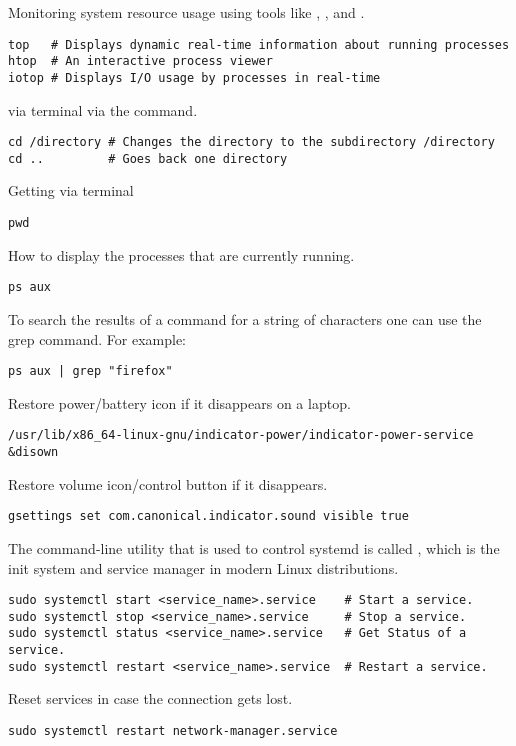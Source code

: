 Monitoring system resource usage using tools like , , and .
\begin{lstlisting}
top   # Displays dynamic real-time information about running processes
htop  # An interactive process viewer
iotop # Displays I/O usage by processes in real-time
\end{lstlisting}

 via terminal via the command.
\begin{lstlisting}
cd /directory # Changes the directory to the subdirectory /directory
cd ..         # Goes back one directory
\end{lstlisting}

Getting  via terminal
\begin{lstlisting}
pwd
\end{lstlisting}

How to display the processes that are currently running.
\begin{lstlisting}
ps aux
\end{lstlisting}

To search the results of a command for a string of characters one can use the grep command. For example:
\begin{lstlisting}
ps aux | grep "firefox"
\end{lstlisting}

Restore power/battery icon if it disappears on a laptop.
\begin{lstlisting}
/usr/lib/x86_64-linux-gnu/indicator-power/indicator-power-service &disown 
\end{lstlisting}

Restore volume icon/control button if it disappears.
\begin{lstlisting}
gsettings set com.canonical.indicator.sound visible true
\end{lstlisting}

The command-line utility that is used to control systemd is called , which is the init system and service manager in modern Linux distributions.
\begin{lstlisting}
sudo systemctl start <service_name>.service    # Start a service.
sudo systemctl stop <service_name>.service     # Stop a service.
sudo systemctl status <service_name>.service   # Get Status of a service.
sudo systemctl restart <service_name>.service  # Restart a service.
\end{lstlisting}

Reset  services in case the connection gets lost.
\begin{lstlisting}
sudo systemctl restart network-manager.service
\end{lstlisting}

